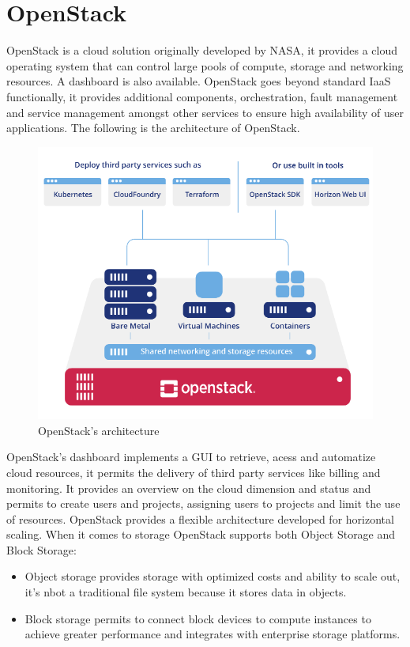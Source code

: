 \section{OpenStack}
OpenStack is a cloud solution originally developed by NASA, it provides a cloud operating system that can control large pools of compute, storage and networking resources. A dashboard is also available. \n
OpenStack goes beyond standard IaaS functionally, it provides additional components, orchestration, fault management and service management amongst other services to ensure high availability of user applications. The following is the architecture of OpenStack.
\begin{figure}
    \centering
    \includegraphics[scale=0.6]{img/OpenStack.png}
    \caption{OpenStack's architecture}
\end{figure}
OpenStack's dashboard implements a GUI to retrieve, acess and automatize cloud resources, it permits the delivery of third party services like billing and monitoring. It provides an overview on the cloud dimension and status and permits to create users and projects, assigning users to projects and limit the use of resources. OpenStack provides a flexible architecture developed for horizontal scaling. \n
When it comes to storage OpenStack supports both Object Storage and Block Storage:
\begin{itemize}
    \item Object storage provides storage with optimized costs and ability to scale out, it's nbot a traditional file system because it stores data in objects.
    \item Block storage permits to connect block devices to compute instances to achieve greater performance and integrates with enterprise storage platforms.
\end{itemize}
